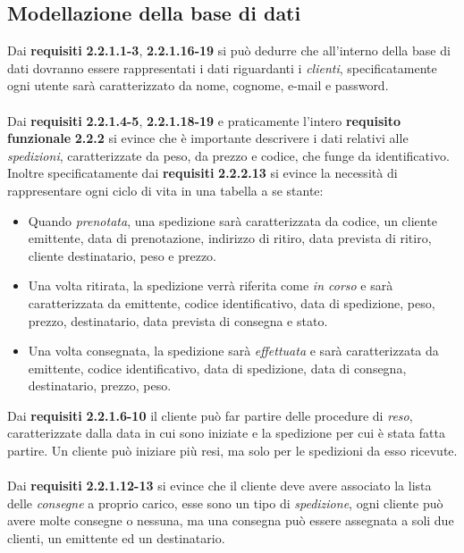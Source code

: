 \subsection{Modellazione della base di dati}
Dai \textbf{requisiti} \textbf{2.2.1.1-3}, \textbf{2.2.1.16-19} si può dedurre che all'interno della base di dati dovranno essere rappresentati
i dati riguardanti i \textit{clienti}, specificatamente ogni utente sarà caratterizzato da nome, cognome, e-mail e password. 
\\\\
Dai \textbf{requisiti} \textbf{2.2.1.4-5}, \textbf{2.2.1.18-19} e praticamente l'intero \textbf{requisito funzionale }\textbf{2.2.2} si evince che è importante descrivere i dati relativi alle \textit{spedizioni}, caratterizzate da peso, da prezzo e codice, che funge da identificativo. Inoltre specificatamente dai \textbf{requisiti} \textbf{2.2.2.13} si evince la necessità di rappresentare ogni ciclo di vita in una tabella a se stante:
\begin{itemize}
	\item Quando \textit{prenotata}, una spedizione sarà caratterizzata da codice, un cliente emittente, data di prenotazione, 
	indirizzo di ritiro, data prevista di ritiro, cliente destinatario, peso e prezzo.
	
	\item Una volta ritirata, la spedizione verrà riferita come \textit{in corso} e sarà caratterizzata da emittente, 
	codice identificativo, data di spedizione, peso, prezzo, destinatario, data prevista di consegna e stato.
	
	\item Una volta consegnata, la spedizione sarà \textit{effettuata} e sarà caratterizzata da emittente, codice identificativo, 
	data di spedizione, data di consegna, destinatario, prezzo, peso.
\end{itemize}  
Dai \textbf{requisiti} \textbf{2.2.1.6-10} il cliente può far partire delle procedure di \textit{reso}, caratterizzate dalla data in cui sono iniziate e la spedizione per cui è stata fatta partire. Un cliente può iniziare più resi, ma solo per le spedizioni da esso ricevute.
\\\\
Dai \textbf{requisiti} \textbf{2.2.1.12-13} si evince che il cliente deve avere associato la lista delle \textit{consegne} a proprio carico,  esse sono un tipo di \textit{spedizione}, ogni cliente può avere molte consegne o nessuna, ma una consegna può essere assegnata a soli due clienti, un emittente ed un destinatario.
